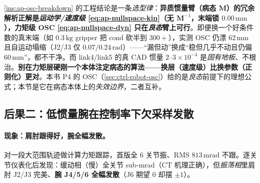 \begin{insight}\label{ins:ap-redundancy-level}
\cref{ins:ap-osc-breakdown} 的工程结论是一条\emph{选型律}：\textbf{异质惯量臂（病态 $\mathbf{M}$）的冗余解析正解是\emph{运动学/速度级} \cref{eq:ap-nullspace-kin}（无 $\mathbf{M}^{-1}$，末端锁 $0.00\,\mathrm{mm}$），力矩级 OSC \cref{eq:ap-nullspace-dyn} 只在\emph{良态}臂上可行}。即便换一个好条件数的真末端（如 $0.3\,\mathrm{kg}$ gripper 把 $\mathrm{cond}$ 砍半到 $300+$），实测 OSC 仍漂 $62\,\mathrm{mm}$ 且自运动塌缩（J2/J3 仅 $0.07/0.24\,\mathrm{rad}$）——“漏但动”换成“稳但几乎不动且仍偏 $60\,\mathrm{mm}$”，都不干净。而 link4/link5 的真 CAD 惯量 $2$--$3\times10^{-4}$ 是\emph{固有地板}、不根治。\textbf{别在力矩层硬刚一个本体注定病态的算法——换层（速度级）比换参数（正则化）更对}。本书 P4 的 OSC（\cref{sec:ctrl-robot-osc}）给的是\emph{良态}前提下的理想公式；本节是它在病态本体上的\emph{失效边界}，二者互补。
\end{insight}

\subsection{后果二：低惯量腕在控制率下欠采样发散}
\label{sec:ap-lowinertia}

\paragraph{现象：肩肘跟得好，腕全幅发散。}
对一段大范围轨迹做计算力矩跟踪，首版全 $6$ 关节振、RMS $813\,\mathrm{mrad}$ 不跟。逐关节仪表化后发现：缓动相（慢）全关节 sub-mrad（CT 机理正确），但\emph{振荡相}里肩肘 J2/J3 完美、\textbf{腕 J4/5/6 全幅发散}（J6 期望 $0$ 却摆 $\pm1$）。

